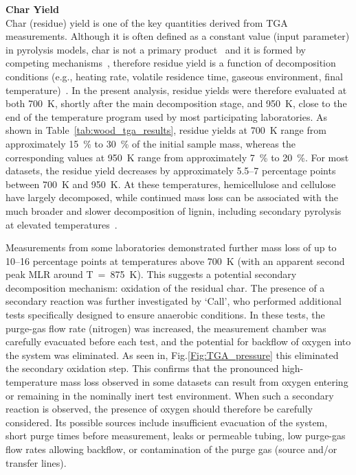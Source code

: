 \documentclass{book}
\begin{document}
\textbf{Char Yield}\\
 Char (residue) yield is one of the key quantities derived from TGA measurements. Although it is often defined as a constant value (input parameter) in pyrolysis models, char is not a primary product~\cite{lewellen1977cellulose} and it is formed by competing mechanisms~\cite{broido1975char}, therefore residue yield is a function of decomposition conditions (e.g., heating rate, volatile residence time, gaseous environment, final temperature)~\cite{anca2016reaction, collard2014review,neves2011characterization}. In the present analysis, residue yields were therefore evaluated at both 700~K, shortly after the main decomposition stage, and 950~K, close to the end of the temperature program used by most participating laboratories. As shown in Table~\ref{tab:wood_tga_results}, residue yields at 700~K range from approximately 15~\% to 30~\% of the initial sample mass, whereas the corresponding values at 950~K range from approximately 7~\% to 20~\%. For most datasets, the residue yield decreases by approximately 5.5--7 percentage points between 700~K and 950~K. At these temperatures, hemicellulose and cellulose have largely decomposed, while continued mass loss can be associated with the much broader and slower decomposition of lignin, including secondary pyrolysis at elevated temperatures~\cite{yang2007characteristics}.

 Measurements from some laboratories demonstrated further mass loss of up to 10--16 percentage points at temperatures above 700~K (with an apparent second peak MLR around T~=~875~K). This suggests a potential secondary decomposition mechanism: oxidation of the residual char. The presence of a secondary reaction was further investigated by `Call', who performed additional tests specifically designed to ensure anaerobic conditions. In these tests, the purge-gas flow rate (nitrogen) was increased, the measurement chamber was carefully evacuated before each test, and the potential for backflow of oxygen into the system was eliminated. As seen in, Fig.\ref{Fig:TGA_pressure} this eliminated the secondary oxidation step. This confirms that the pronounced high-temperature mass loss observed in some datasets can result from oxygen entering or remaining in the nominally inert test environment. When such a secondary reaction is observed, the presence of oxygen should therefore be carefully considered. Its possible sources include insufficient evacuation of the system, short purge times before measurement, leaks or permeable tubing, low purge-gas flow rates allowing backflow, or contamination of the purge gas (source and/or transfer lines).
\end{document}
